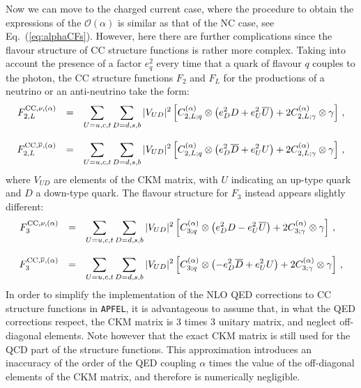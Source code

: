 Now we can move to the charged current case, where
the procedure to obtain the expressions of the
$\mathcal{O}(\alpha)$ is similar as that of the NC case,
see Eq.~(\ref{eq:alphaCFs}). However, here there are further
complications since the flavour structure of
CC structure functions is rather
more complex.
%
Taking into account the presence of a factor $e_q^2$
every time that a quark of flavour $q$ couples to the photon, the CC
structure functions $F_2$ and $F_L$ for the productions of a neutrino
or an anti-neutrino take the form:
\begin{equation}\label{compactNu}
\begin{array}{rcl}
F_{2,L}^{{\rm CC},\nu,(\alpha)} &=& \displaystyle
                              \sum_{U=u,c,t}\sum_{D=d,s,b}|V_{UD}|^2\left[C_{2,L;q}^{(\alpha)}\otimes\left(e_D^2D +e_U^2\overline{U}\right) +2 C_{2,L;\gamma}^{(\alpha)}\otimes\gamma\right]\,,\\
\\
F_{2,L}^{{\rm CC},\overline{\nu},(\alpha)} &=& \displaystyle
\sum_{U=u,c,t}\sum_{D=d,s,b}|V_{UD}|^2\left[C_{2,L;q}^{(\alpha)}\otimes\left(e_D^2\overline{D}
    +e_U^2U\right) +2 C_{2,L;\gamma}^{(\alpha)}\otimes\gamma\right]\,,
\end{array}
\end{equation}
where $V_{UD}$ are elements of the CKM matrix, with $U$ indicating
an up-type quark
and $D$ a down-type quark.
%
The flavour
structure for $F_3$ instead appears slightly different:
\begin{equation}\label{compactNuF3}
\begin{array}{rcl}
F_3^{{\rm CC},\nu,(\alpha)} &=& \displaystyle
                              \sum_{U=u,c,t}\sum_{D=d,s,b}|V_{UD}|^2\left[C_{3;q}^{(\alpha)}\otimes\left(e_D^2D -e_U^2\overline{U}\right) +2 C_{3;\gamma}^{(\alpha)}\otimes\gamma\right]\,,\\
\\
F_3^{{\rm CC},\overline{\nu},(\alpha)} &=& \displaystyle
\sum_{U=u,c,t}\sum_{D=d,s,b}|V_{UD}|^2\left[C_{3;q}^{(\alpha)}\otimes\left(-e_D^2\overline{D}
    +e_U^2U\right) +2 C_{3;\gamma}^{(\alpha)}\otimes\gamma\right]\,,
\end{array}
\end{equation}
In order to simplify the implementation of the NLO QED
corrections to CC structure functions in {\tt APFEL},
it is advantageous to assume that, in what the QED corrections
respect, the CKM matrix is  3 times 3 unitary
matrix, and neglect off-diagonal elements.
%
Note however that the exact CKM matrix
is still used for the QCD part of the structure functions.
%
This approximation introduces an inaccuracy
of the order of the QED coupling $\alpha$ times
the value of the  off-diagonal elements of the CKM matrix, and
therefore is numerically negligible.

